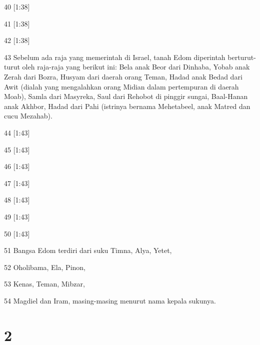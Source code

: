 \par 40 [1:38]
\par 41 [1:38]
\par 42 [1:38]
\par 43 Sebelum ada raja yang memerintah di Israel, tanah Edom diperintah berturut-turut oleh raja-raja yang berikut ini: Bela anak Beor dari Dinhaba, Yobab anak Zerah dari Bozra, Husyam dari daerah orang Teman, Hadad anak Bedad dari Awit (dialah yang mengalahkan orang Midian dalam pertempuran di daerah Moab), Samla dari Masyreka, Saul dari Rehobot di pinggir sungai, Baal-Hanan anak Akhbor, Hadad dari Pahi (istrinya bernama Mehetabeel, anak Matred dan cucu Mezahab).
\par 44 [1:43]
\par 45 [1:43]
\par 46 [1:43]
\par 47 [1:43]
\par 48 [1:43]
\par 49 [1:43]
\par 50 [1:43]
\par 51 Bangsa Edom terdiri dari suku Timna, Alya, Yetet,
\par 52 Oholibama, Ela, Pinon,
\par 53 Kenas, Teman, Mibzar,
\par 54 Magdiel dan Iram, masing-masing menurut nama kepala sukunya.

\chapter{2}

